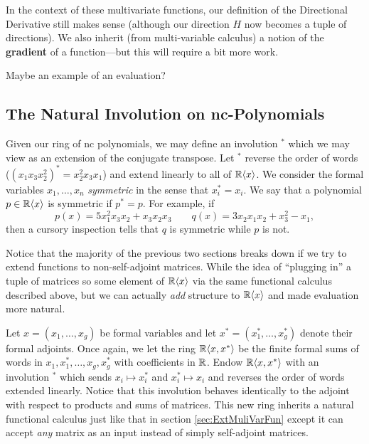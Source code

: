 In the context of these multivariate functions, our definition of the
Directional Derivative still makes sense (although our direction \(H\) now
becomes a tuple of directions). We also inherit (from multi-variable calculus) a
notion of the \textbf{gradient} of a function---but this will require a bit more work.

{\color{red} Maybe an example of an evaluation?}

\subsection{The Natural Involution on nc-Polynomials}%
\label{ssec:NatInvo}

Given our ring of nc polynomials, we may define an involution \(^*\) which we
may view as an extension of the conjugate transpose. Let \(^*\) reverse the
order of words (\ie \((x_1x_3x_2^2)^* = x_2^2x_3x_1\)) and extend linearly to
all of \(\mathbb{R} \langle x \rangle \). We consider the formal
variables \(x_1, \dots , x_n\) \emph{symmetric} in the sense that
\(x_i^* = x_i\). We say that a polynomial \(p \in \mathbb{R} \langle x \rangle \) is
symmetric if \(p^* = p\). For example, if
\[
  p(x) = 5x_1^2x_3x_2 + x_3x_2x_3 \qquad q(x) = 3x_2x_1x_2 + x_3^2 - x_1 ,
\]
then a cursory inspection tells that \(q\) is symmetric while \(p\) is not.

Notice that the majority of the previous two sections breaks down if we try to
extend functions to non-self-adjoint matrices. While the idea of ``plugging in''
a tuple of matrices so some element of \(\mathbb{R} \langle x \rangle \) via the same
functional calculus described above, but we can actually \emph{add} structure to
\(\mathbb{R} \langle x \rangle \) and made evaluation more natural.

Let \(x = (x_1, \dots, x_g)\) be formal variables and let
\(x^* = (x_1^*, \dots, x_g^*)\) denote their formal adjoints. Once again, we let
the ring \(\mathbb{R} \langle x,x^* \rangle \) be the finite formal sums of words in
\(x_1,x_1^*, \dots , x_g,x_g^*\) with coefficients in \(\mathbb{R} \). Endow
\(\mathbb{R} \langle x,x^* \rangle \) with an involution \(^*\) which sends
\(x_i \mapsto x_i^*\) and \(x_i^* \mapsto x_i\) and reverses the order of words
extended linearly. Notice that this involution behaves identically to the
adjoint with respect to products and sums of matrices. This new ring inherits a
natural functional calculus just like that in section \ref{sec:ExtMuliVarFun}
except it can accept \emph{any} matrix as an input instead of simply
self-adjoint matrices.

